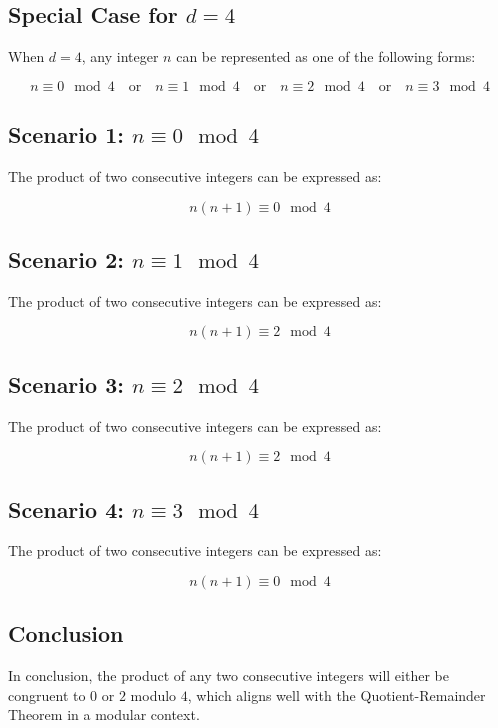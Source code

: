 \documentclass[12pt]{article}
\begin{document}
\newpage

\subsection{Special Case for \( d = 4 \)}

When \( d = 4 \), any integer \( n \) can be represented as one of the following forms:

\[
n \equiv 0 \mod{4} \quad \text{or} \quad n \equiv 1 \mod{4} \quad \text{or} \quad n \equiv 2 \mod{4} \quad \text{or} \quad n \equiv 3 \mod{4}
\]

\subsection{Scenario 1: \( n \equiv 0 \mod{4} \)}

The product of two consecutive integers can be expressed as:

\[
n(n+1) \equiv 0 \mod{4}
\]

\subsection{Scenario 2: \( n \equiv 1 \mod{4} \)}

The product of two consecutive integers can be expressed as:

\[
n(n+1) \equiv 2 \mod{4}
\]

\subsection{Scenario 3: \( n \equiv 2 \mod{4} \)}

The product of two consecutive integers can be expressed as:

\[
n(n+1) \equiv 2 \mod{4}
\]

\subsection{Scenario 4: \( n \equiv 3 \mod{4} \)}

The product of two consecutive integers can be expressed as:

\[
n(n+1) \equiv 0 \mod{4}
\]

\subsection{Conclusion}

In conclusion, the product of any two consecutive integers will either be congruent to \( 0 \) or \( 2 \) modulo \( 4 \), which aligns well with the Quotient-Remainder Theorem in a modular context.
\end{document}
